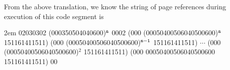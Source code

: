 \documentclass[12pt,letterpaper]{article}
\begin{document}
\vspace{2ex}

From the above translation, we know the string of page references during execution of this code segment is 

\vspace{2ex}

\hangindent2em 02030302 (000350504040600)$\tt ^n$ 0002 (000 (00050400506040500600)$\tt ^n$ 151161411511) (000 (00050400506040500600)$\tt ^{n-1}$ 151161411511) $\cdots$ (000 (00050400506040500600)$^2$ 151161411511) (000 00050400506040500600 151161411511) 00
\end{document}
